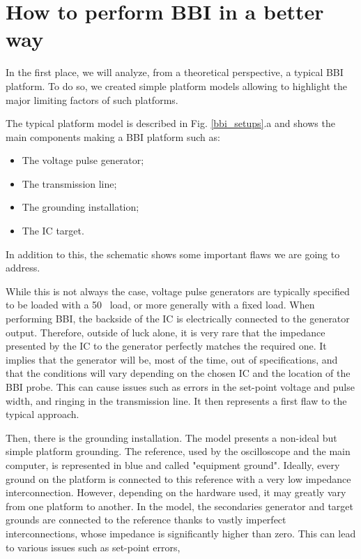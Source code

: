 
\section{How to perform BBI in a better way}
	In the first place, we will analyze, from a theoretical perspective, a typical BBI platform.
	To do so, we created simple platform models allowing to highlight the major limiting factors of such platforms.
	
	The typical platform model is described in Fig. \ref{bbi_setups}.a and shows the main components making a BBI platform such as:
	\begin{itemize}
		\item The voltage pulse generator;
		\item The transmission line;
		\item The grounding installation;
		\item The IC target.
	\end{itemize}
	In addition to this, the schematic shows some important flaws we are going to address.
	
	While this is not always the case, voltage pulse generators are typically specified to be loaded with a 50 \textOmega\ load, or more generally with a fixed load.
	When performing BBI, the backside of the IC is electrically connected to the generator output.
	Therefore, outside of luck alone, it is very rare that the impedance presented by the IC to the generator perfectly matches the required one.
	It implies that the generator will be, most of the time, out of specifications, and that the conditions will vary depending on the chosen IC and the location of the BBI probe.
	This can cause issues such as errors in the set-point voltage and pulse width, and ringing in the transmission line.
	It then represents a first flaw to the typical approach.
	
	Then, there is the grounding installation.
	The model presents a non-ideal but simple platform grounding.
	The reference, used by the oscilloscope and the main computer, is represented in blue and called "equipment ground".
	Ideally, every ground on the platform is connected to this reference with a very low impedance interconnection.
	However, depending on the hardware used, it may greatly vary from one platform to another.
	In the model, the secondaries generator and target grounds are connected to the reference thanks to vastly imperfect interconnections, whose impedance is significantly higher than zero.
	This can lead to various issues such as set-point errors, 
	
